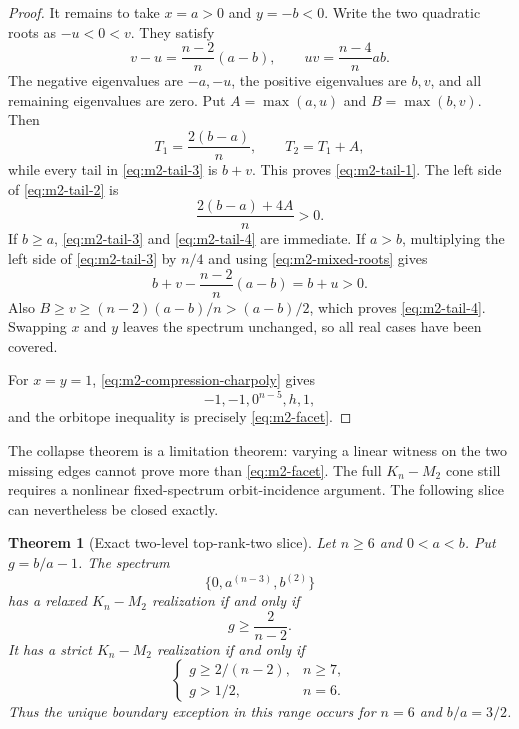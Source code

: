 \documentclass[11pt,reqno]{amsart}
\newtheorem{theorem}{Theorem}[section]
\theoremstyle{definition}
\theoremstyle{remark}
\begin{document}
\begin{proof}
It remains to take $x=a>0$ and $y=-b<0$.  Write the two quadratic roots as
$-u<0<v$.  They satisfy
\begin{equation}\label{eq:m2-mixed-roots}
 v-u=\frac{n-2}{n}(a-b),\qquad uv=\frac{n-4}{n}ab.
\end{equation}
The negative eigenvalues are $-a,-u$, the positive eigenvalues are $b,v$,
and all remaining eigenvalues are zero.  Put
$A=\max(a,u)$ and $B=\max(b,v)$.  Then
\[
 T_1=\frac{2(b-a)}n,\qquad T_2=T_1+A,
\]
while every tail in \eqref{eq:m2-tail-3} is $b+v$.  This proves
\eqref{eq:m2-tail-1}.  The left side of \eqref{eq:m2-tail-2} is
\[
 \frac{2(b-a)+4A}{n}>0.
\]
If $b\ge a$, \eqref{eq:m2-tail-3} and \eqref{eq:m2-tail-4} are immediate.
If $a>b$, multiplying the left side of \eqref{eq:m2-tail-3} by $n/4$ and
using \eqref{eq:m2-mixed-roots} gives
\[
 b+v-\frac{n-2}{n}(a-b)=b+u>0.
\]
Also
$B\ge v\ge(n-2)(a-b)/n>(a-b)/2$, which proves
\eqref{eq:m2-tail-4}.  Swapping $x$ and $y$ leaves the spectrum unchanged,
so all real cases have been covered.

For $x=y=1$, \eqref{eq:m2-compression-charpoly} gives
\[
 -1,-1,0^{n-5},h,1,
\]
and the orbitope inequality is precisely \eqref{eq:m2-facet}.
\end{proof}

The collapse theorem is a limitation theorem: varying a linear witness on
the two missing edges cannot prove more than \eqref{eq:m2-facet}.  The full
$K_n-M_2$ cone still requires a nonlinear fixed-spectrum orbit-incidence
argument.  The following slice can nevertheless be closed exactly.

\begin{theorem}[Exact two-level top-rank-two slice]
\label{thm:m2-ranktwo-slice}
Let $n\ge6$ and $0<a<b$.  Put $g=b/a-1$.  The spectrum
\begin{equation}\label{eq:m2-ranktwo-spectrum}
 \{0,a^{(n-3)},b^{(2)}\}
\end{equation}
has a relaxed $K_n-M_2$ realization if and only if
\[
 g\ge\frac2{n-2}.
\]
It has a strict $K_n-M_2$ realization if and only if
\[
 \begin{cases}
  g\ge 2/(n-2),&n\ge7,\\
  g>1/2,&n=6.
 \end{cases}
\]
Thus the unique boundary exception in this range occurs for $n=6$ and
$b/a=3/2$.
\end{theorem}
\end{document}
